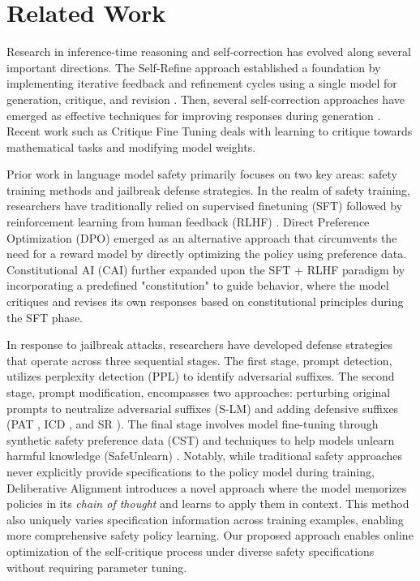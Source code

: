 \section{Related Work}
Research in inference-time reasoning and self-correction has evolved along several important directions. The Self-Refine approach established a foundation by implementing iterative feedback and refinement cycles using a single model for generation, critique, and revision \citep{madaan2024self}. Then, several self-correction approaches have emerged as effective techniques for improving responses during generation \citep{shinn2024reflexion,shridhar2023art, ganguli2023capacity}. Recent work such as Critique Fine Tuning \citep{wang2025critique} deals with learning to critique towards mathematical tasks and modifying model weights.

Prior work in language model safety primarily focuses on two key areas: safety training methods and jailbreak defense strategies. In the realm of safety training, researchers have traditionally relied on supervised finetuning (SFT) followed by reinforcement learning from human feedback (RLHF) \citep{christiano2017deep}. Direct Preference Optimization (DPO) \citep{rafailov2024direct} emerged as an alternative approach that circumvents the need for a reward model by directly optimizing the policy using preference data. Constitutional AI (CAI) \citep{bai2022constitutional} further expanded upon the SFT + RLHF paradigm by incorporating a predefined "constitution" to guide behavior, where the model critiques and revises its own responses based on constitutional principles during the SFT phase.

In response to jailbreak attacks, researchers have developed defense strategies that operate across three sequential stages. The first stage, prompt detection, utilizes perplexity detection (PPL) \citep{alon2024detecting} to identify adversarial suffixes. The second stage, prompt modification, encompasses two approaches: perturbing original prompts to neutralize adversarial suffixes (S-LM) \citep{robey2023smoothllm} and adding defensive suffixes (PAT \cite{mo2024studious}, ICD \cite{Wei2023JailbreakAG}, and SR \cite{Xie2023DefendingCA}). The final stage involves model fine-tuning through synthetic safety preference data (CST) \citep{gallego2024configurable} and techniques to help models unlearn harmful knowledge (SafeUnlearn) \citep{zhang2024safe}. Notably, while traditional safety approaches never explicitly provide specifications to the policy model during training, Deliberative Alignment \citep{guan2024deliberative} introduces a novel approach where the model memorizes policies in its \emph{chain of thought} and learns to apply them in context. This method also uniquely varies specification information across training examples, enabling more comprehensive safety policy learning. Our proposed approach enables online optimization of the self-critique process under diverse safety specifications without requiring parameter tuning.